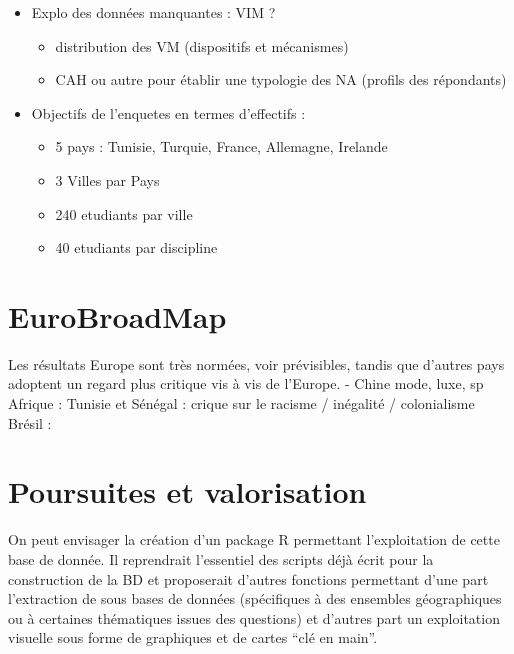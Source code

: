 \documentclass[
  12pt,
  a4paper,
]{scrbook}
\providecommand{\tightlist}{%
  \setlength{\itemsep}{0pt}\setlength{\parskip}{0pt}}\usepackage{longtable,booktabs,array}
\begin{document}
\begin{itemize}
\tightlist
\item
  Explo des données manquantes : VIM ?

  \begin{itemize}
  \tightlist
  \item
    distribution des VM (dispositifs et mécanismes)
  \item
    CAH ou autre pour établir une typologie des NA (profils des
    répondants)
  \end{itemize}
\item
  Objectifs de l'enquetes en termes d'effectifs :

  \begin{itemize}
  \tightlist
  \item
    5 pays : Tunisie, Turquie, France, Allemagne, Irelande
  \item
    3 Villes par Pays
  \item
    240 etudiants par ville
  \item
    40 etudiants par discipline
  \end{itemize}
\end{itemize}

\hypertarget{eurobroadmap}{%
\section{EuroBroadMap}\label{eurobroadmap}}

Les résultats Europe sont très normées, voir prévisibles, tandis que
d'autres pays adoptent un regard plus critique vis à vis de l'Europe. -
Chine mode, luxe, sp Afrique : Tunisie et Sénégal : crique sur le
racisme / inégalité / colonialisme Brésil :

\hypertarget{poursuites-et-valorisation}{%
\section{Poursuites et valorisation}\label{poursuites-et-valorisation}}

On peut envisager la création d'un package R permettant l'exploitation
de cette base de donnée. Il reprendrait l'essentiel des scripts déjà
écrit pour la construction de la BD et proposerait d'autres fonctions
permettant d'une part l'extraction de sous bases de données (spécifiques
à des ensembles géographiques ou à certaines thématiques issues des
questions) et d'autres part un exploitation visuelle sous forme de
graphiques et de cartes ``clé en main''.
\end{document}
